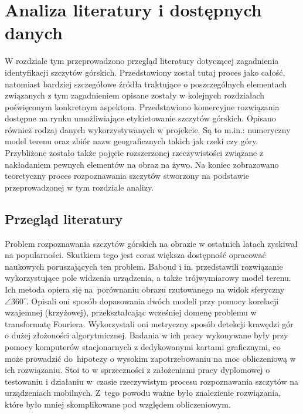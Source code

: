 \newpage

\section{Analiza literatury i dostępnych danych} \label{sec:literatura}

W rozdziale tym przeprowadzono przegląd literatury dotyczącej zagadnienia identyfikacji szczytów górskich. Przedstawiony został tutaj proces jako całość, natomiast bardziej szczegółowe źródła traktujące o poszczególnych elementach związanych z tym zagadnieniem opisane zostały w kolejnych rozdziałach poświęconym konkretnym aspektom. Przedstawiono komercyjne rozwiązania dostępne na rynku umożliwiające etykietowanie szczytów górskich. Opisano również rodzaj danych wykorzystywanych w projekcie. Są to m.in.: numeryczny model terenu oraz zbiór nazw geograficznych takich jak rzeki czy góry. Przybliżone zostało także pojęcie rozszerzonej rzeczywistości związane z nakładaniem pewnych elementów na obraz na żywo. Na koniec zobrazowano teoretyczny proces rozpoznawania szczytów stworzony na podstawie przeprowadzonej w tym rozdziale analizy. 

\subsection{Przegląd literatury}

Problem rozpoznawania szczytów górskich na obrazie w ostatnich latach zyskiwał na popularności. Skutkiem tego jest coraz większa dostępność opracować naukowych poruszających ten problem. Baboud i in. \cite{auto-terrain}  przedstawili rozwiązanie wykorzystujące pole widzenia urządzenia, a także trójwymiarowy model terenu. Ich metoda opiera się na~porównaniu obrazu rzutowanego na widok sferyczny $\angle 360^{\circ}$. Opisali oni sposób dopasowania dwóch modeli przy pomocy korelacji wzajemnej (krzyżowej), przekształcając wcześniej domenę problemu w transformatę Fouriera. Wykorzystali oni metryczny sposób detekcji krawędzi gór o dużej złożoności algorytmicznej. Badania w ich pracy wykonywane były przy pomocy komputerów stacjonarnych z dedykowanymi kartami graficznymi, co może prowadzić do~hipotezy o wysokim zapotrzebowaniu na moc obliczeniową w ich rozwiązaniu. Stoi to w sprzeczności z założeniami pracy dyplomowej o testowaniu i działaniu w~czasie rzeczywistym procesu rozpoznawania szczytów na urządzeniach mobilnych. Z~tego powodu ważne było znalezienie rozwiązania, które było mniej skomplikowane pod względem obliczeniowym.

